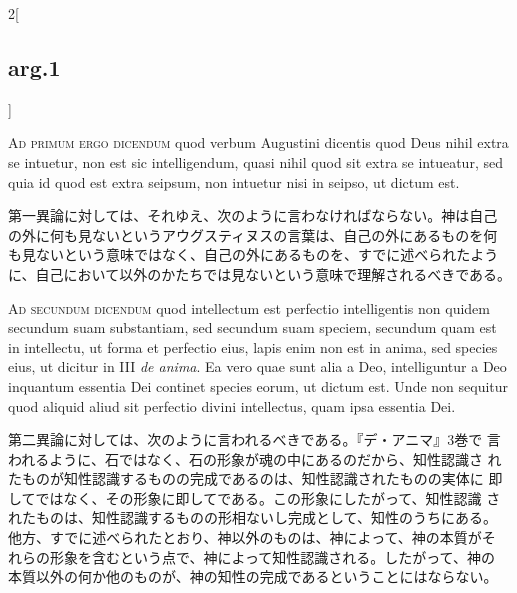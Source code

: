 \documentclass[paper=a4paper,fontsize=10pt,jafontsize=9pt,titlepage]{jlreq}
\begin{document}
\begin{paracol}{2}[\subsection{arg.1}]
\switchcolumn*[\subsection{ad.1}]

{\scshape Ad primum ergo dicendum} quod verbum Augustini dicentis quod
Deus nihil extra se intuetur, non est sic intelligendum, quasi nihil
quod sit extra se intueatur, sed quia id quod est extra seipsum, non
intuetur nisi in seipso, ut dictum est.

\switchcolumn

第一異論に対しては、それゆえ、次のように言わなければならない。神は自己
の外に何も見ないというアウグスティヌスの言葉は、自己の外にあるものを何
も見ないという意味ではなく、自己の外にあるものを、すでに述べられたよう
に、自己において以外のかたちでは見ないという意味で理解されるべきである。

\switchcolumn*[\subsection{ad.2}]

{\scshape Ad secundum dicendum} quod intellectum est perfectio
intelligentis non quidem secundum suam substantiam, sed secundum suam
speciem, secundum quam est in intellectu, ut forma et perfectio eius,
lapis enim non est in anima, sed species eius, ut dicitur in III
{\itshape de anima}. Ea vero quae sunt alia a Deo, intelliguntur a Deo
inquantum essentia Dei continet species eorum, ut dictum est. Unde non
sequitur quod aliquid aliud sit perfectio divini intellectus, quam
ipsa essentia Dei.

\switchcolumn

第二異論に対しては、次のように言われるべきである。『デ・アニマ』3巻で
言われるように、石ではなく、石の形象が魂の中にあるのだから、知性認識さ
れたものが知性認識するものの完成であるのは、知性認識されたものの実体に
即してではなく、その形象に即してである。この形象にしたがって、知性認識
されたものは、知性認識するものの形相ないし完成として、知性のうちにある。
他方、すでに述べられたとおり、神以外のものは、神によって、神の本質がそ
れらの形象を含むという点で、神によって知性認識される。したがって、神の
本質以外の何か他のものが、神の知性の完成であるということにはならない。

\switchcolumn*[\subsection{ad.3}]


\end{paracol}
\end{document}
